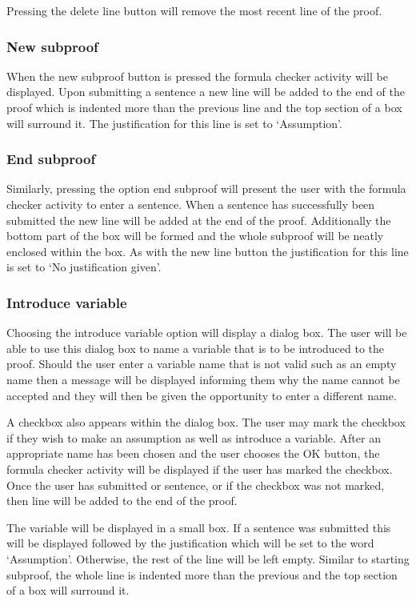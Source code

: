 Pressing the delete line button will remove the most recent line of the proof.

\subsubsection*{New subproof}
When the new subproof button is pressed the formula checker activity will be displayed. Upon submitting a sentence a new line will be added  to the end of the proof which is indented more than the previous line and the top section of a box will surround it. The justification for this line is set to `Assumption'.
\subsubsection*{End subproof}
Similarly, pressing the option end subproof will present the user with the formula checker activity to enter a sentence. When a sentence has successfully been submitted the new line will be added at the end of the proof. Additionally the bottom part of the box will be formed and the whole subproof will be neatly enclosed within the box. As with the new line button the justification for this line is set to `No justification given'.

\subsubsection*{Introduce variable}

Choosing the introduce variable option will display a dialog box. The user will be able to use this dialog box to name a variable that is to be introduced to the proof. Should the user enter a variable name that is not valid such as an empty name then a message will be displayed informing them why the name cannot be accepted and they will then be given the opportunity to enter a different name.


A checkbox also appears within the dialog box. The user may mark the checkbox if they wish to make an assumption as well as introduce a variable. After an appropriate name has been chosen and the user chooses the OK button, the formula checker activity will be displayed  if the user has marked the checkbox. Once the user has submitted or sentence, or if the checkbox was not marked, then line will be added to the end of the proof.

The variable will be displayed in a small box. If a sentence was submitted this will be displayed followed by the justification which will be set to the word `Assumption'. Otherwise, the rest of the line will be left empty. Similar to starting subproof, the whole line is indented more than the previous and the top section of a box will surround it.



